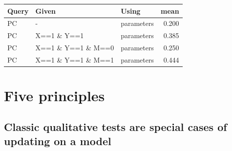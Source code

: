 \documentclass[
  12pt,
]{book}
\newenvironment{Shaded}{\begin{snugshade}}{\end{snugshade}}
\newcommand{\DataTypeTok}[1]{\textcolor[rgb]{0.13,0.29,0.53}{#1}}
\newcommand{\DecValTok}[1]{\textcolor[rgb]{0.00,0.00,0.81}{#1}}
\newcommand{\FloatTok}[1]{\textcolor[rgb]{0.00,0.00,0.81}{#1}}
\newcommand{\KeywordTok}[1]{\textcolor[rgb]{0.13,0.29,0.53}{\textbf{#1}}}
\newcommand{\NormalTok}[1]{#1}
\newcommand{\OperatorTok}[1]{\textcolor[rgb]{0.81,0.36,0.00}{\textbf{#1}}}
\newcommand{\OtherTok}[1]{\textcolor[rgb]{0.56,0.35,0.01}{#1}}
\newcommand{\StringTok}[1]{\textcolor[rgb]{0.31,0.60,0.02}{#1}}
\begin{document}
\begin{Shaded}
\end{Shaded}

\begin{tabular}{l|l|l|r}
\hline
Query & Given & Using & mean\\
\hline
PC & - & parameters & 0.200\\
\hline
PC & X==1 \& Y==1 & parameters & 0.385\\
\hline
PC & X==1 \& Y==1 \& M==0 & parameters & 0.250\\
\hline
PC & X==1 \& Y==1 \& M==1 & parameters & 0.444\\
\hline
\end{tabular}

\hypertarget{five-principles}{%
\section{Five principles}\label{five-principles}}

\hypertarget{classic-qualitative-tests-are-special-cases-of-updating-on-a-model}{%
\subsection{Classic qualitative tests are special cases of updating on a model}\label{classic-qualitative-tests-are-special-cases-of-updating-on-a-model}}
\end{document}
